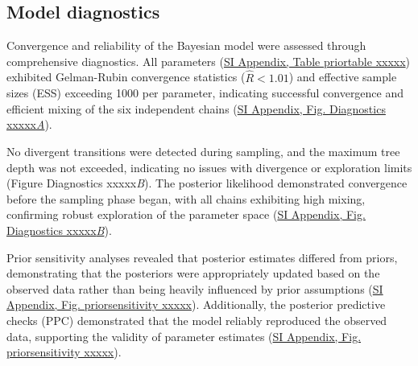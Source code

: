 \documentclass{article}
\begin{document}
%


\subsection{Model diagnostics}

Convergence and reliability of the Bayesian model were assessed through comprehensive diagnostics. All parameters (\href{SI_Appendix.pdf}{SI Appendix, Table priortable xxxxx}) exhibited Gelman-Rubin convergence statistics ($\hat{R} < 1.01$) and effective
sample sizes (ESS) exceeding 1000 per parameter, indicating successful convergence and efficient mixing of
the six independent chains (\href{SI_Appendix.pdf}{SI Appendix, Fig. Diagnostics xxxxx\textit{A}}). 


No divergent transitions were detected during sampling, and the maximum tree depth was not exceeded, indicating no issues with divergence or exploration limits (Figure Diagnostics xxxxx\textit{B}). The posterior likelihood demonstrated convergence before the sampling phase began, with all chains exhibiting high mixing, confirming robust exploration of the parameter space (\href{SI_Appendix.pdf}{SI Appendix, Fig. Diagnostics xxxxx\textit{B}}).

Prior sensitivity analyses revealed that posterior estimates differed from priors, demonstrating that the posteriors were appropriately updated based on the observed data rather than being heavily influenced by prior assumptions (\href{SI_Appendix.pdf}{SI Appendix, Fig. priorsensitivity xxxxx}). Additionally, the posterior predictive checks (PPC) demonstrated that the model reliably reproduced the observed data, supporting the validity of parameter estimates (\href{SI_Appendix.pdf}{SI Appendix, Fig. priorsensitivity xxxxx}). 
\end{document}
